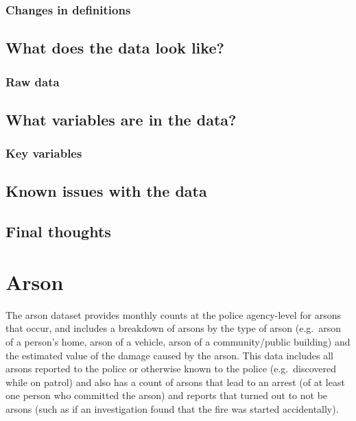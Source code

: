 \documentclass[
  12pt,
  openany]{book}
\begin{document}
\hypertarget{changes-in-definitions-3}{%
\subsection{Changes in definitions}\label{changes-in-definitions-3}}

\hypertarget{what-does-the-data-look-like-3}{%
\section{What does the data look like?}\label{what-does-the-data-look-like-3}}

\hypertarget{raw-data-2}{%
\subsection{Raw data}\label{raw-data-2}}

\hypertarget{what-variables-are-in-the-data-3}{%
\section{What variables are in the data?}\label{what-variables-are-in-the-data-3}}

\hypertarget{key-variables-3}{%
\subsection{Key variables}\label{key-variables-3}}

\hypertarget{known-issues-with-the-data-3}{%
\section{Known issues with the data}\label{known-issues-with-the-data-3}}

\hypertarget{final-thoughts-3}{%
\section{Final thoughts}\label{final-thoughts-3}}

\hypertarget{arson-1}{%
\chapter{Arson}\label{arson-1}}

The arson dataset provides monthly counts at the police agency-level for arsons that occur, and includes a breakdown of arsons by the type of arson (e.g.~arson of a person's home, arson of a vehicle, arson of a community/public building) and the estimated value of the damage caused by the arson. This data includes all arsons reported to the police or otherwise known to the police (e.g.~discovered while on patrol) and also has a count of arsons that lead to an arrest (of at least one person who committed the arson) and reports that turned out to not be arsons (such as if an investigation found that the fire was started accidentally).
\end{document}
